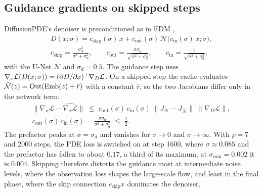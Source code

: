 \subsection{Guidance gradients on skipped steps}\label{sec:app-guidance-error}
DiffusionPDE's denoiser is preconditioned as in EDM \citep{karras2022edm},
\begin{equation}
\begin{gathered}
  D(x;\sigma) = c_{\mathrm{skip}}(\sigma)\,x + c_{\mathrm{out}}(\sigma)\,\mathcal N\big(c_{\mathrm{in}}(\sigma)\,x;\sigma\big),\\
  c_{\mathrm{skip}} = \frac{\sigma_d^2}{\sigma^2+\sigma_d^2},\qquad c_{\mathrm{out}} = \frac{\sigma\sigma_d}{\sqrt{\sigma^2+\sigma_d^2}},\qquad c_{\mathrm{in}} = \frac{1}{\sqrt{\sigma^2+\sigma_d^2}},
\end{gathered}
\end{equation}
with the U-Net $\mathcal N$ and $\sigma_d=0.5$. The guidance step uses $\nabla_x\mathcal L(D(x;\sigma)) = (\partial D/\partial x)^{\top}\nabla_D\mathcal L$. On a skipped step the cache evaluates $\hat{\mathcal N}(z) = \mathrm{Out}(\mathrm{Emb}(z)+\hat r)$ with a constant $\hat r$, so the two Jacobians differ only in the network term:
\begin{equation}
\begin{gathered}
  \Big\|\nabla_x\mathcal L - \widehat{\nabla_x\mathcal L}\Big\| \;\le\; c_{\mathrm{out}}(\sigma)\,c_{\mathrm{in}}(\sigma)\;\big\|J_{\mathcal N} - J_{\hat{\mathcal N}}\big\|\;\|\nabla_D\mathcal L\|,\\
  c_{\mathrm{out}}(\sigma)\,c_{\mathrm{in}}(\sigma) = \frac{\sigma\sigma_d}{\sigma^2+\sigma_d^2}\;\le\;\frac12 .
\end{gathered}
\end{equation}
The prefactor peaks at $\sigma=\sigma_d$ and vanishes for $\sigma\to0$ and $\sigma\to\infty$. With $\rho=7$ and 2000 steps, the PDE loss is switched on at step 1600, where $\sigma\approx0.085$ and the prefactor has fallen to about $0.17$, a third of its maximum; at $\sigma_{\min}=0.002$ it is $0.004$. Skipping therefore distorts the guidance most at intermediate noise levels, where the observation loss shapes the large-scale flow, and least in the final phase, where the skip connection $c_{\mathrm{skip}}x$ dominates the denoiser.

